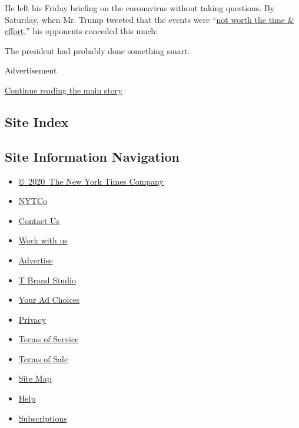 He left his Friday briefing on the coronavirus without taking questions.
By Saturday, when Mr. Trump tweeted that the events were
``\href{https://www.nytimes.com/2020/04/25/us/coronavirus-news.html}{not
worth the time \& effort},'' his opponents conceded this much:

The president had probably done something smart.

Advertisement

\protect\hyperlink{after-bottom}{Continue reading the main story}

\hypertarget{site-index}{%
\subsection{Site Index}\label{site-index}}

\hypertarget{site-information-navigation}{%
\subsection{Site Information
Navigation}\label{site-information-navigation}}

\begin{itemize}
\tightlist
\item
  \href{https://help.nytimes.com/hc/en-us/articles/115014792127-Copyright-notice}{©~2020~The
  New York Times Company}
\end{itemize}

\begin{itemize}
\tightlist
\item
  \href{https://www.nytco.com/}{NYTCo}
\item
  \href{https://help.nytimes.com/hc/en-us/articles/115015385887-Contact-Us}{Contact
  Us}
\item
  \href{https://www.nytco.com/careers/}{Work with us}
\item
  \href{https://nytmediakit.com/}{Advertise}
\item
  \href{http://www.tbrandstudio.com/}{T Brand Studio}
\item
  \href{https://www.nytimes.com/privacy/cookie-policy\#how-do-i-manage-trackers}{Your
  Ad Choices}
\item
  \href{https://www.nytimes.com/privacy}{Privacy}
\item
  \href{https://help.nytimes.com/hc/en-us/articles/115014893428-Terms-of-service}{Terms
  of Service}
\item
  \href{https://help.nytimes.com/hc/en-us/articles/115014893968-Terms-of-sale}{Terms
  of Sale}
\item
  \href{https://spiderbites.nytimes.com}{Site Map}
\item
  \href{https://help.nytimes.com/hc/en-us}{Help}
\item
  \href{https://www.nytimes.com/subscription?campaignId=37WXW}{Subscriptions}
\end{itemize}
